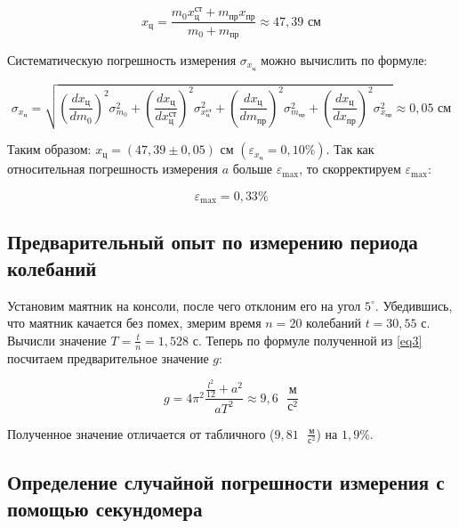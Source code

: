 \documentclass[a4paper,12pt]{article}
\begin{document}
\begin{equation}
    x_\text{ц} = \frac{m_0 x_\text{ц}^\text{ст} + m_\text{пр} x_\text{пр}}{m_0 + m_\text{пр}} \approx 47,39 \text{ см}
\end{equation}

Систематическую погрешность измерения $\sigma_{x_\text{ц}}$ можно вычислить по формуле:

\begin{equation}
    \sigma_{x_\text{ц}} = \sqrt{
    \left( \frac{d x_\text{ц}}{d m_0}  \right) ^ 2 \sigma_{m_0} ^ 2 + 
    \left( \frac{d x_\text{ц}}{d x_\text{ц}^\text{ст}}  \right) ^ 2 \sigma_{x_\text{ц}^\text{ст}} ^ 2 + 
    \left( \frac{d x_\text{ц}}{d m_\text{пр}}  \right) ^ 2 \sigma_{m_\text{пр}} ^ 2 + 
    \left( \frac{d x_\text{ц}}{d x_\text{пр}}  \right) ^ 2 \sigma_{x_\text{пр}} ^ 2
    } \approx 0,05 \text{ см}
\end{equation}

Таким образом: $x_\text{ц} = (47,39 \pm 0,05) \text{ см } (\varepsilon_{x_\text{ц}} = 0,10 \%)$.
Так как относительная погрешность измерения $a$ больше $\varepsilon_\text{max}$, то скорректируем $\varepsilon_\text{max}$:

\begin{equation}
    \varepsilon_\text{max} = 0,33 \%
\end{equation}

\subsection{Предварительный опыт по измерению периода колебаний}

Установим маятник на консоли, после чего отклоним его на угол $5^\circ$. Убедившись, что маятник качается без помех, змерим время $n = 20$ колебаний $t = 30,55 \text{ с}$. Вычисли значение $T = \frac{t}{n} = 1,528 \text{ с}$. Теперь по формуле полученной из \eqref{eq3} посчитаем предварительное значение $g$:

\begin{equation}\label{calc-g}
    g = 4\pi^2 \frac{\frac{l^2}{12} + a^2}{a T^2} \approx 9,6 \text{ } \frac{\text{м}}{\text{с}^2}
\end{equation}

Полученное значение отличается от табличного ($9,81 \text{ } \frac{\text{м}}{\text{с}^2}$) на $1,9 \%$.

\subsection{Определение случайной погрешности измерения с помощью секундомера}
\end{document}
